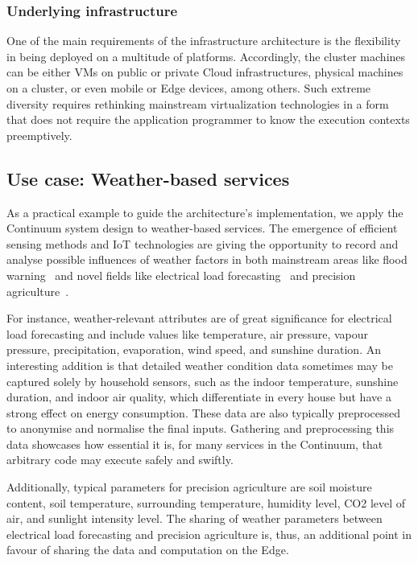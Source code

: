\subsubsection{Underlying infrastructure}

One of the main requirements of the infrastructure architecture is the flexibility in being deployed on a multitude of platforms. Accordingly, the cluster machines can be either VMs on public or private Cloud infrastructures, physical machines on a cluster, or even mobile or Edge devices, among others. Such extreme diversity requires rethinking mainstream virtualization technologies in a form that does not require the application programmer to know the execution contexts preemptively.

\subsection{Use case: Weather-based services}\label{sec:uc}

As a practical example to guide the architecture's implementation, we apply the Continuum system design to weather-based services. The emergence of efficient sensing methods and IoT technologies are giving the opportunity to record and analyse possible influences of weather factors in both mainstream areas like flood warning~\cite{brzoza2016embedded} and novel fields like electrical load forecasting~\cite{weather-load-forecasting} and precision agriculture~\cite{keswani2019adapting}.

For instance, weather-relevant attributes are of great significance for electrical load forecasting and include values like temperature, air pressure, vapour pressure, precipitation, evaporation, wind speed, and sunshine duration. An interesting addition is that detailed weather condition data sometimes may be captured solely by household sensors, such as the indoor temperature, sunshine duration, and indoor air quality, which differentiate in every house but have a strong effect on energy consumption. These data are also typically preprocessed to anonymise and normalise the final inputs. Gathering and preprocessing this data showcases how essential it is, for many services in the Continuum, that arbitrary code may execute safely and swiftly.

Additionally, typical parameters for precision agriculture are soil moisture content, soil temperature, surrounding temperature, humidity level, CO2 level of air, and sunlight intensity level. The sharing of weather parameters between electrical load forecasting and precision agriculture is, thus, an additional point in favour of sharing the data and computation on the Edge.

